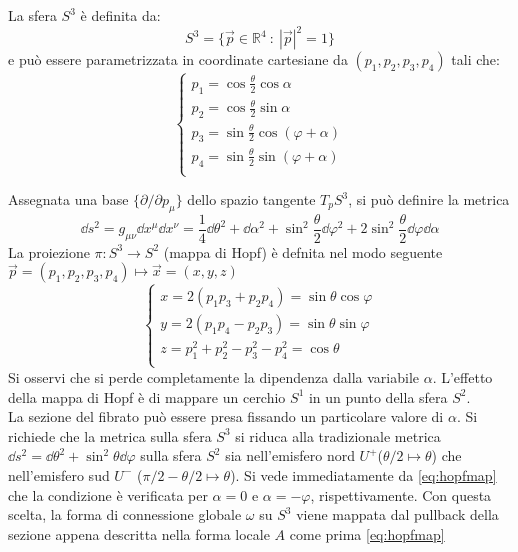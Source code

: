 La sfera $S^3$ è definita da:
$$ S^3 = \{ \vec p \in \mathbb{R}^4 \: : \: |\vec p|^2 = 1 \} $$
e può essere parametrizzata in coordinate cartesiane da $(p_1,p_2,p_3,p_4)$
tali che:
\begin{equation}
   \begin{cases}
      p_1 = \cos \frac{\theta}{2} \cos \alpha \\
      p_2 = \cos \frac{\theta}{2} \sin \alpha \\
      p_3 = \sin \frac{\theta}{2} \cos (\varphi  + \alpha) \\
      p_4 = \sin \frac{\theta}{2} \sin (\varphi  + \alpha) \\
   \end{cases}
\end{equation}

Assegnata una base $ \{ \partial/\partial p_\mu \} $ dello spazio tangente
$T_p S^3$, si può definire la metrica
\begin{equation}
   \dd  s^2 = g_{\mu\nu} \dd x^\mu \dd x^\nu
         = \frac{1}{4} \dd \theta^2 + \dd \alpha^2 + \sin^2\frac{\theta}{2}\dd \varphi ^2
         + 2\sin^2\frac{\theta}{2} \dd \varphi  \dd \alpha
\end{equation}
La proiezione $\pi : S^3 \to S^2$ (mappa di Hopf) è defnita nel modo seguente
$\vec p = (p_1,p_2,p_3,p_4) \mapsto \vec x = (x,y,z)$
\begin{equation}\label{eq:hopfmap}
   \begin{cases}
      x = 2(p_1 p_3 + p_2 p_4)          = \sin\theta \cos\varphi  \\
      y = 2(p_1 p_4 - p_2 p_3)          = \sin\theta \sin\varphi  \\
      z = p_1^2 + p_2^2 - p_3^2 - p_4^2 = \cos\theta          \\
   \end{cases}
\end{equation}
Si osservi che si perde completamente la dipendenza dalla variabile $\alpha$.
L'effetto della mappa di Hopf è di mappare un cerchio $S^1$ in un punto
della sfera $S^2$.\\

La sezione del fibrato può essere presa fissando un particolare valore di $\alpha$.
Si richiede che la metrica sulla sfera $S^3$ si riduca alla tradizionale metrica
$\dd s^2 = \dd \theta^2 + \sin^2\theta \dd \varphi $ sulla sfera $S^2$ sia nell'emisfero
nord $U^+$($ \theta/2 \mapsto \theta $) che nell'emisfero sud $U^-$
($\pi /2 - \theta /2 \mapsto \theta $). Si vede immediatamente da \ref{eq:hopfmap} che la
condizione è verificata per $\alpha = 0$ e $\alpha = -\varphi $, rispettivamente.
Con questa scelta, la forma di connessione globale $\omega$ su $S^3$
viene mappata dal pullback della sezione appena descritta nella forma locale $A$
come prima \ref{eq:hopfmap}\\

